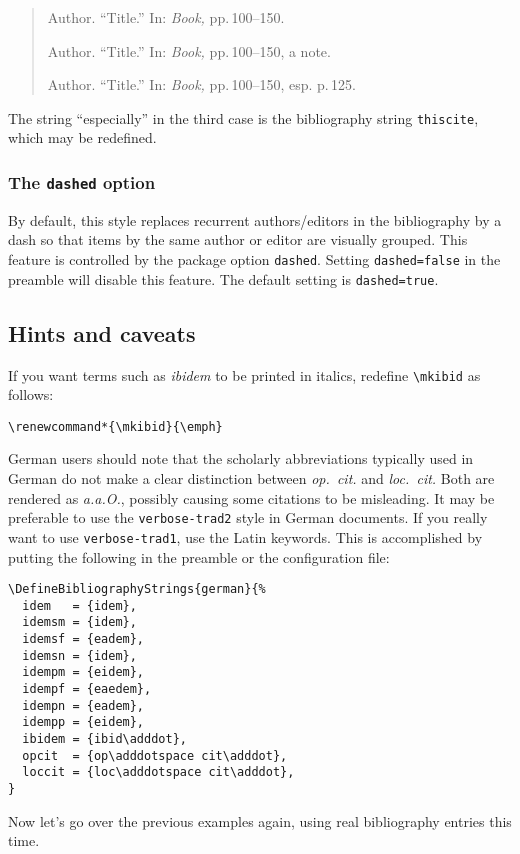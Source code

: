\documentclass[a4paper]{article}
\newcommand*{\cmd}[1]{\texttt{\textbackslash #1}}
\begin{document}
\begin{quote}
Author. \enquote{Title.} In: \emph{Book,} pp.\,100--150.

Author. \enquote{Title.} In: \emph{Book,} pp.\,100--150, a note.

Author. \enquote{Title.} In: \emph{Book,} pp.\,100--150, esp. p.\,125.
\end{quote}
%
The string \enquote{especially} in the third case is the bibliography
string \texttt{thiscite}, which may be redefined.

\subsubsection*{The \texttt{dashed} option}

By default, this style replaces recurrent authors/editors in the
bibliography by a dash so that items by the same author or editor
are visually grouped. This feature is controlled by the package
option \texttt{dashed}. Setting \texttt{dashed=false} in the
preamble will disable this feature. The default setting is
\texttt{dashed=true}.

\subsection*{Hints and caveats}

If you want terms such as \emph{ibidem} to be printed in italics,
redefine \cmd{mkibid} as follows:

\begin{verbatim}
\renewcommand*{\mkibid}{\emph}
\end{verbatim}
%
German users should note that the scholarly abbreviations typically
used in German do not make a clear distinction between
\emph{op.~cit.} and \emph{loc.~cit.} Both are rendered as
\emph{a.a.O.}, possibly causing some citations to be misleading. It
may be preferable to use the \texttt{verbose-trad2} style in German
documents. If you really want to use \texttt{verbose-trad1}, use the
Latin keywords. This is accomplished by putting the following in the
preamble or the configuration file:

\begin{verbatim}
\DefineBibliographyStrings{german}{%
  idem   = {idem},
  idemsm = {idem},
  idemsf = {eadem},
  idemsn = {idem},
  idempm = {eidem},
  idempf = {eaedem},
  idempn = {eadem},
  idempp = {eidem},
  ibidem = {ibid\adddot},
  opcit  = {op\adddotspace cit\adddot},
  loccit = {loc\adddotspace cit\adddot},
}
\end{verbatim}
%
Now let's go over the previous examples again, using real
bibliography entries this time.
\end{document}
